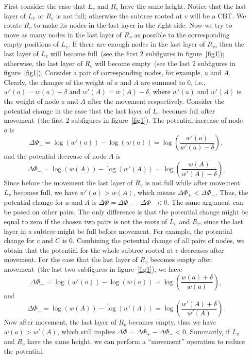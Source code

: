 \documentclass[11pt]{article}
\begin{document}
First consider the case that $L_v$ and $R_v$ have the same height.
Notice that the last layer of $L_v$ or $R_v$ is not full;
otherwise the subtree rooted at $v$ will be a CBT.
We rotate $R_v$ to make its nodes in the last layer in the right side.
Now we try to move as many nodes in the last layer of $R_v$ as possible to the corresponding 
empty positions of $L_v$.
If there are enough nodes in the last layer of $R_v$, then the last layer of $L_v$ will become full~(see the first 2 subfigures in figure~\ref{fig1});
otherwise, the last layer of $R_v$ will become empty~(see the last 2 subfigures in figure~\ref{fig1}).
Consider a pair of corresponding nodes, for example, $a$ and $A$.
Clearly, the changes of the weight of $a$ and $A$ are summed to 0, i.e., 
$w'(a) = w(a) + \delta$ and $w'(A) = w(A) - \delta$,
where $w'(a)$ and $w'(A)$ is the weight of node $a$ and $A$ after the movement respectively.
Consider the potential change in the case that the last layer of $L_v$ becomes full after movement~(the first 2 subfigures in figure~\ref{fig1}).
The potential increase of node $a$ is 
$$\Delta\Phi_{+} = \log(w'(a)) - \log(w(a)) = \log\left(\frac{w'(a) }{w'(a) - \delta}\right),$$
and the potential decrease of node $A$ is 
$$\Delta\Phi_{-} = \log(w(A)) - \log(w'(A)) = \log\left(\frac{w(A) }{w'(A) - \delta}\right).$$
Since before the movement the last layer of $R_v$ is not full while after movement $L_v$ becomes full,
we have $w'(a) > w(A)$, which means $\Delta\Phi_{+} < \Delta\Phi_{-}$.
Thus, the potential change for $a$ and $A$ is $\Delta\Phi = \Delta\Phi_{+} - \Delta\Phi_{-} < 0$.
The same argument can be posed on other pairs. 
The only difference is that the potential change might be equal to zero 
if the chosen two pairs is not the roots of $L_v$ and $R_v$,
since the last layer in a subtree might be full before movement.
For example, the potential change for $c$ and $C$ is 0.
Combining the potential change of all pairs of nodes, 
we obtain that the potential for the whole subtree rooted at $v$ decreases after movement.
For the case that the last layer of $R_v$ becomes empty after movement~(the last two subfigures in figure~\ref{fig1}), we have 
$$\Delta\Phi_{+} = \log(w'(a)) - \log(w(a)) = \log\left(\frac{w(a) + \delta}{w(a)}\right),$$
and
$$\Delta\Phi_{-} = \log(w(A)) - \log(w'(A)) = \log\left(\frac{w'(A) + \delta}{w'(A)}\right).$$
Now after movement, the last layer of $R_v$ becomes empty,
thus we have $w(a) > w'(A)$, which still implies $\Delta\Phi = \Delta\Phi_{+} - \Delta\Phi_{-} < 0$. 
Summarily, if $L_v$ and $R_v$ have the same height, we can perform a ``movement'' operation to reduce the potential.
\end{document}
